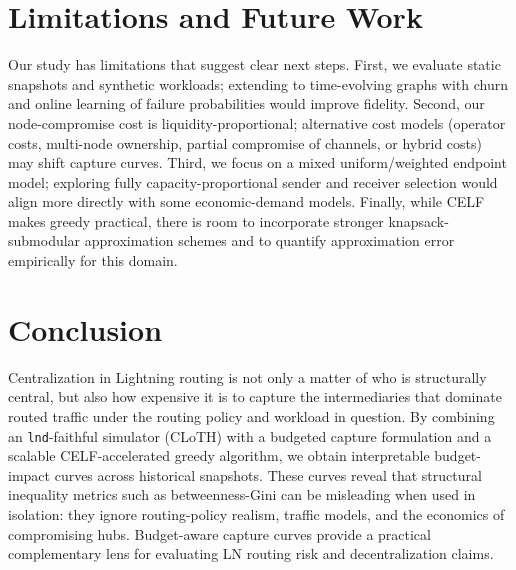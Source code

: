 \documentclass{article}
\begin{document}
\section{Limitations and Future Work}
\label{sec:limitations}

Our study has limitations that suggest clear next steps.
First, we evaluate static snapshots and synthetic workloads; extending to time-evolving graphs with churn and online learning of failure probabilities would improve fidelity.
Second, our node-compromise cost is liquidity-proportional; alternative cost models (operator costs, multi-node ownership, partial compromise of channels, or hybrid costs) may shift capture curves.
Third, we focus on a mixed uniform/weighted endpoint model; exploring fully capacity-proportional sender and receiver selection would align more directly with some economic-demand models.
Finally, while CELF makes greedy practical, there is room to incorporate stronger knapsack-submodular approximation schemes and to quantify approximation error empirically for this domain.

\section{Conclusion}
\label{sec:conclusion}

Centralization in Lightning routing is not only a matter of who is structurally central, but also how expensive it is to capture the intermediaries that dominate routed traffic under the routing policy and workload in question.
By combining an \texttt{lnd}-faithful simulator (CLoTH) with a budgeted capture formulation and a scalable CELF-accelerated greedy algorithm, we obtain interpretable budget-impact curves across historical snapshots.
These curves reveal that structural inequality metrics such as betweenness-Gini can be misleading when used in isolation: they ignore routing-policy realism, traffic models, and the economics of compromising hubs.
Budget-aware capture curves provide a practical complementary lens for evaluating LN routing risk and decentralization claims.

\clearpage



\end{document}
